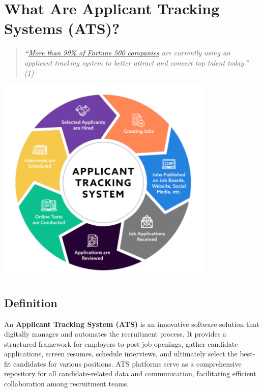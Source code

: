 \documentclass[
]{book}
\begin{document}
\hypertarget{what-are-applicant-tracking-systems-ats}{%
\chapter{What Are Applicant Tracking Systems (ATS)?}\label{what-are-applicant-tracking-systems-ats}}

\begin{quote}
\emph{\textbf{``}\href{https://medium.com/swlh/90-of-fortune-500-companies-use-an-applicant-tracking-system-whats-it-5a6b6d25e5e7}{More than 90\% of Fortune 500 companies} are currently using an applicant tracking system to better attract and convert top talent today.'' (1)}
\end{quote}

\includegraphics[width=4.08333in,height=\textheight]{ats pic.png}

\hypertarget{definition}{%
\section{Definition}\label{definition}}

An \textbf{Applicant Tracking System (ATS)} is an innovative software solution that digitally manages and automates the recruitment process. It provides a structured framework for employers to post job openings, gather candidate applications, screen resumes, schedule interviews, and ultimately select the best-fit candidates for various positions. ATS platforms serve as a comprehensive repository for all candidate-related data and communication, facilitating efficient collaboration among recruitment teams.
\end{document}
